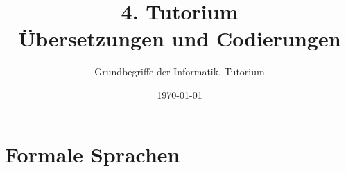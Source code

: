 




\title[Übersetzungen und Codierungen]{4. Tutorium\\ Übersetzungen und Codierungen}
\subtitle{Grundbegriffe der Informatik, Tutorium \hashtag\mytutnumber}
\date{\today}


\titleframe
\roadmap


\section{Formale Sprachen}




% 

% 

% 

